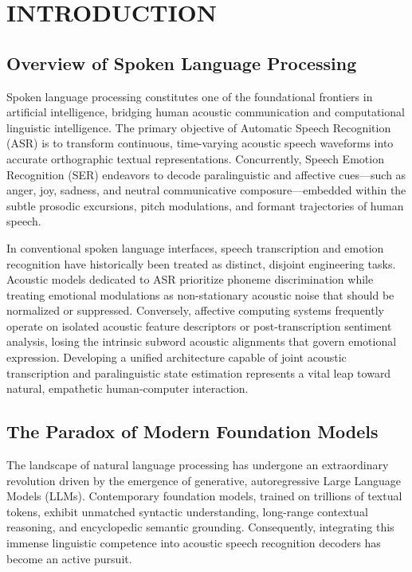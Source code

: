 \chapter{INTRODUCTION}
\label{ch:intro}

\section{Overview of Spoken Language Processing}
Spoken language processing constitutes one of the foundational frontiers in artificial intelligence, bridging human acoustic communication and computational linguistic intelligence. The primary objective of Automatic Speech Recognition (ASR) is to transform continuous, time-varying acoustic speech waveforms into accurate orthographic textual representations. Concurrently, Speech Emotion Recognition (SER) endeavors to decode paralinguistic and affective cues—such as anger, joy, sadness, and neutral communicative composure—embedded within the subtle prosodic excursions, pitch modulations, and formant trajectories of human speech. 

In conventional spoken language interfaces, speech transcription and emotion recognition have historically been treated as distinct, disjoint engineering tasks. Acoustic models dedicated to ASR prioritize phoneme discrimination while treating emotional modulations as non-stationary acoustic noise that should be normalized or suppressed. Conversely, affective computing systems frequently operate on isolated acoustic feature descriptors or post-transcription sentiment analysis, losing the intrinsic subword acoustic alignments that govern emotional expression. Developing a unified architecture capable of joint acoustic transcription and paralinguistic state estimation represents a vital leap toward natural, empathetic human-computer interaction.

\section{The Paradox of Modern Foundation Models}
The landscape of natural language processing has undergone an extraordinary revolution driven by the emergence of generative, autoregressive Large Language Models (LLMs). Contemporary foundation models, trained on trillions of textual tokens, exhibit unmatched syntactic understanding, long-range contextual reasoning, and encyclopedic semantic grounding. Consequently, integrating this immense linguistic competence into acoustic speech recognition decoders has become an active pursuit.

